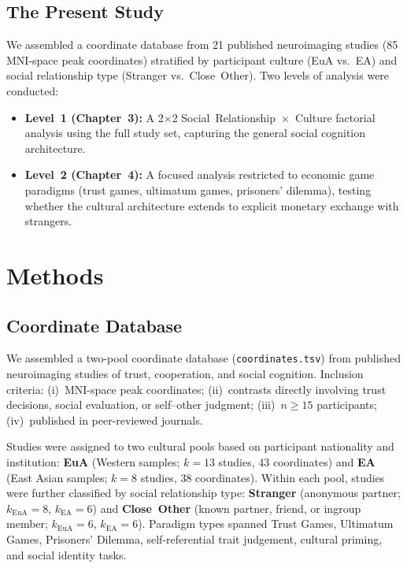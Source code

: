 \documentclass[11pt,a4paper]{article}
\begin{document}
\subsection{The Present Study}

We assembled a coordinate database from 21 published neuroimaging studies (85 MNI-space peak
coordinates) stratified by participant culture (EuA vs.\ EA) and social relationship type
(Stranger vs.\ Close~Other). Two levels of analysis were conducted:

\begin{itemize}
  \item \textbf{Level~1 (Chapter~3):} A 2$\times$2 Social~Relationship~$\times$~Culture factorial
    analysis using the full study set, capturing the general social cognition architecture.
  \item \textbf{Level~2 (Chapter~4):} A focused analysis restricted to economic game paradigms
    (trust games, ultimatum games, prisoners' dilemma), testing whether the cultural architecture
    extends to explicit monetary exchange with strangers.
\end{itemize}

\section{Methods}

\subsection{Coordinate Database}

We assembled a two-pool coordinate database (\texttt{coordinates.tsv}) from published
neuroimaging studies of trust, cooperation, and social cognition. Inclusion criteria:
(i)~MNI-space peak coordinates; (ii)~contrasts directly involving trust decisions, social
evaluation, or self--other judgment; (iii)~$n \geq 15$ participants; (iv)~published in
peer-reviewed journals.

Studies were assigned to two cultural pools based on participant nationality and institution:
\textbf{EuA} (Western samples; $k=13$ studies, 43 coordinates) and \textbf{EA} (East Asian
samples; $k=8$ studies, 38 coordinates). Within each pool, studies were further classified
by social relationship type: \textbf{Stranger} (anonymous partner; $k_{\text{EuA}}=8$,
$k_{\text{EA}}=6$) and \textbf{Close~Other} (known partner, friend, or ingroup member;
$k_{\text{EuA}}=6$, $k_{\text{EA}}=6$). Paradigm types spanned Trust Games, Ultimatum
Games, Prisoners' Dilemma, self-referential trait judgement, cultural priming, and social
identity tasks.
\end{document}
